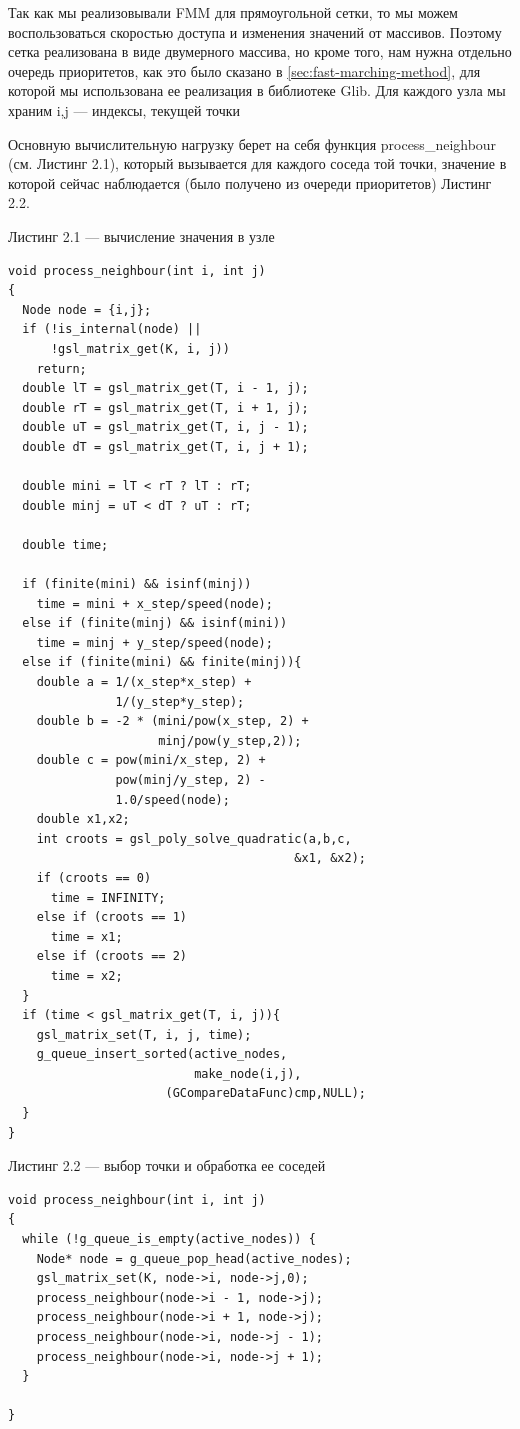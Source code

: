 Так как мы реализовывали FMM для прямоугольной сетки, то мы можем
воспользоваться скоростью доступа и изменения значений от
массивов. Поэтому сетка реализована в виде двумерного массива, но
кроме того, нам нужна отдельно очередь приоритетов, как это было
сказано в \ref{sec:fast-marching-method}, для которой мы использована
ее реализация в библиотеке Glib. Для каждого узла мы храним i,j ---
индексы, текущей точки

Основную вычислительную нагрузку берет на себя функция
process\_neighbour (см. Листинг 2.1), который вызывается для каждого соседа той точки,
значение в которой сейчас наблюдается (было получено из очереди
приоритетов) Листинг 2.2.

\vspace{1em}
Листинг 2.1 --- вычисление значения в узле 
\normalsize
\begin{verbatim} 
void process_neighbour(int i, int j)
{
  Node node = {i,j};
  if (!is_internal(node) || 
      !gsl_matrix_get(K, i, j)) 
    return;
  double lT = gsl_matrix_get(T, i - 1, j);
  double rT = gsl_matrix_get(T, i + 1, j);
  double uT = gsl_matrix_get(T, i, j - 1);
  double dT = gsl_matrix_get(T, i, j + 1);

  double mini = lT < rT ? lT : rT;
  double minj = uT < dT ? uT : rT;

  double time;

  if (finite(mini) && isinf(minj))
    time = mini + x_step/speed(node);
  else if (finite(minj) && isinf(mini))
    time = minj + y_step/speed(node);
  else if (finite(mini) && finite(minj)){
    double a = 1/(x_step*x_step) + 
               1/(y_step*y_step);
    double b = -2 * (mini/pow(x_step, 2) +
                     minj/pow(y_step,2));
    double c = pow(mini/x_step, 2) + 
               pow(minj/y_step, 2) - 
               1.0/speed(node);
    double x1,x2;
    int croots = gsl_poly_solve_quadratic(a,b,c, 
                                        &x1, &x2);
    if (croots == 0)
      time = INFINITY;
    else if (croots == 1)
      time = x1;
    else if (croots == 2)
      time = x2;
  }
  if (time < gsl_matrix_get(T, i, j)){
    gsl_matrix_set(T, i, j, time);
    g_queue_insert_sorted(active_nodes,
                          make_node(i,j),
                      (GCompareDataFunc)cmp,NULL);
  }
}
\end{verbatim}
\large


\vspace{1em}
Листинг 2.2 --- выбор точки и обработка ее соседей
\normalsize
\begin{verbatim} 
void process_neighbour(int i, int j)
{
  while (!g_queue_is_empty(active_nodes)) {
    Node* node = g_queue_pop_head(active_nodes);
    gsl_matrix_set(K, node->i, node->j,0);
    process_neighbour(node->i - 1, node->j);
    process_neighbour(node->i + 1, node->j);
    process_neighbour(node->i, node->j - 1);
    process_neighbour(node->i, node->j + 1);
  }

}
\end{verbatim}
\large



